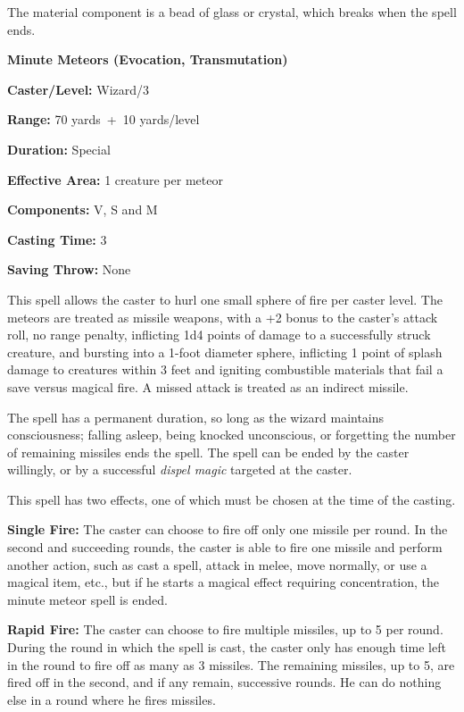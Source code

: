 \begin{multicols}{2}
The material component is a bead of glass or crystal, which breaks when the spell ends.

\vspace{1em}

\noindent
\begin{minipage}{\columnwidth}

\noindent \textbf{Minute Meteors (Evocation, Transmutation)}

\noindent \textbf{Caster/Level:} Wizard/3

\noindent \textbf{Range:} 70 yards~+~10 yards/level

\noindent \textbf{Duration:} Special

\noindent \textbf{Effective Area:} 1 creature per meteor

\noindent \textbf{Components:} V, S and M

\noindent \textbf{Casting Time:} 3

\noindent \textbf{Saving Throw:} None

\end{minipage}

This spell allows the caster to hurl one small sphere of fire per caster level.  The meteors are treated as missile weapons, with a +2 bonus to the caster's attack roll, no range penalty, inflicting 1d4 points of damage to a successfully struck creature, and bursting into a 1-foot diameter sphere, inflicting 1 point of splash damage to creatures within 3 feet and igniting combustible materials that fail a save versus magical fire.  A missed attack is treated as an indirect missile.

The spell has a permanent duration, so long as the wizard maintains consciousness; falling asleep, being knocked unconscious, or forgetting the number of remaining missiles ends the spell.  The spell can be ended by the caster willingly, or by a successful \textit{dispel magic} targeted at the caster.

This spell has two effects, one of which must be chosen at the time of the casting.

\textbf{Single Fire:} The caster can choose to fire off only one missile per round.  In the second and succeeding rounds, the caster is able to fire one missile and perform another action, such as cast a spell, attack in melee, move normally, or use a magical item, etc., but if he starts a magical effect requiring concentration, the minute meteor spell is ended.

\textbf{Rapid Fire:} The caster can choose to fire multiple missiles, up to 5 per round.  During the round in which the spell is cast, the caster only has enough time left in the round to fire off as many as 3 missiles.  The remaining missiles, up to 5, are fired off in the second, and if any remain, successive rounds.  He can do nothing else in a round where he fires missiles.


\end{multicols}
